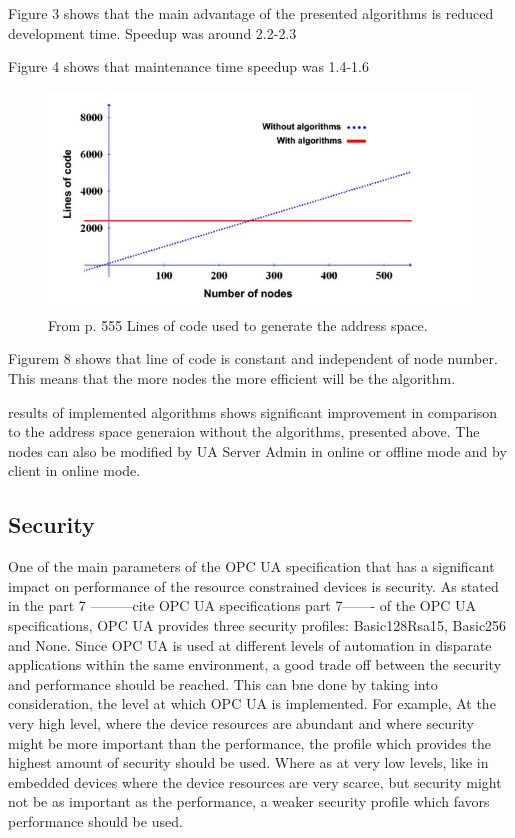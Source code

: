 \documentclass[conference]{IEEEtran}
\begin{document}
Figure 3 shows that the main advantage of the presented algorithms is reduced development time. Speedup was around 2.2-2.3

Figure 4 shows that  maintenance time speedup was 1.4-1.6 

\begin{figure}[ht]
\centering
\includegraphics[width=1\linewidth]{Figures/NodeAlgorithm}\quad
\caption[Subfigure example]{\label{f:NodeAlgorithm}From \cite{addressspace2012efficient} p. 555 Lines of code used to generate the address space.}
\end{figure}

Figurem 8 shows that line of code is constant and independent of node number. This means that the more nodes the more efficient will be the algorithm. 

results of implemented algorithms shows significant improvement in comparison to the address space generaion without the algorithms, presented above. The nodes can also be modified by UA Server Admin in online or offline mode and by client in online mode.

\subsection{Security}
One of the main parameters of the OPC UA specification that has a significant impact on performance of the resource constrained devices is security. As stated in the part 7 ---------cite OPC UA specifications part 7------- of the OPC UA specifications, OPC UA provides three security profiles: Basic128Rsa15, Basic256 and None. Since OPC UA is used at different levels of automation in disparate applications within the same environment, a good trade off between the security and performance should be reached. This can bne done by taking into consideration, the level at which OPC UA is implemented. For example, At the very high level, where the device resources are abundant and where security might be more important than the performance, the profile which provides the highest amount of security should be used. Where as at very low levels, like in embedded devices where the device resources are very scarce, but security might not be as important as the performance, a weaker security profile which favors performance should be used.
\end{document}
